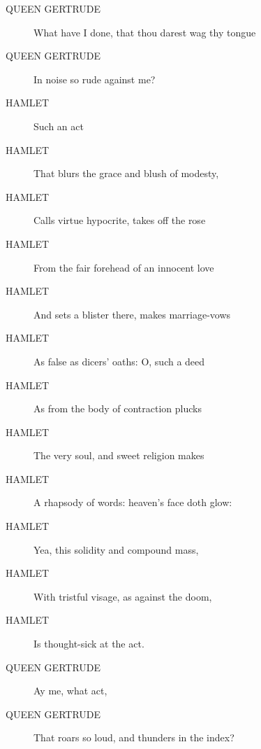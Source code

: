 \documentclass{article}
\begin{document}
\begin{description}
            
\item[QUEEN GERTRUDE] What have I done, that thou darest wag thy tongue
\item[QUEEN GERTRUDE] In noise so rude against me?
\end{description}
          
\begin{description}
            
\item[HAMLET] Such an act
\item[HAMLET] That blurs the grace and blush of modesty,
\item[HAMLET] Calls virtue hypocrite, takes off the rose
\item[HAMLET] From the fair forehead of an innocent love
\item[HAMLET] And sets a blister there, makes marriage-vows
\item[HAMLET] As false as dicers' oaths: O, such a deed
\item[HAMLET] As from the body of contraction plucks
\item[HAMLET] The very soul, and sweet religion makes
\item[HAMLET] A rhapsody of words: heaven's face doth glow:
\item[HAMLET] Yea, this solidity and compound mass,
\item[HAMLET] With tristful visage, as against the doom,
\item[HAMLET] Is thought-sick at the act.
\end{description}
          
\begin{description}
            
\item[QUEEN GERTRUDE] Ay me, what act,
\item[QUEEN GERTRUDE] That roars so loud, and thunders in the index?
\end{description}
          
\end{document}
